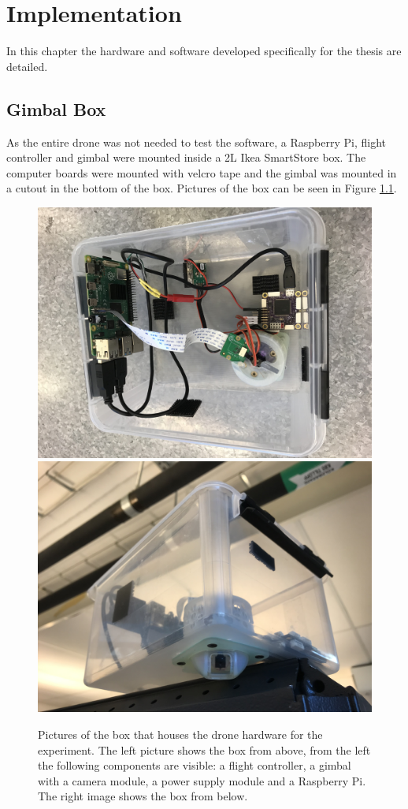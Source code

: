 \documentclass[nofilelist]{cslthse-msc}
\begin{document}
\chapter{Implementation}
In this chapter the hardware and software developed specifically for the thesis are detailed.

\section{Gimbal Box}
As the entire drone was not needed to test the software, a Raspberry Pi, flight controller and gimbal were mounted inside a 2L Ikea SmartStore box. The computer boards were mounted with velcro tape and the gimbal was mounted in a cutout in the bottom of the box. Pictures of the box can be seen in Figure \ref{fig:drone-setup}.

\begin{figure}[htp]
   \centering
   \includegraphics[width=.47\textwidth]{images/drone-box-1.jpg}\hfill
   \includegraphics[width=.47\textwidth]{images/drone-box-2.jpg}
   \caption{Pictures of the box that houses the drone hardware for the experiment. The left picture shows the box from above, from the left the following components are visible: a flight controller, a gimbal with a camera module, a power supply module and a Raspberry Pi. The right image shows the box from below.}
   \label{fig:drone-setup}
\end{figure}
\end{document}
